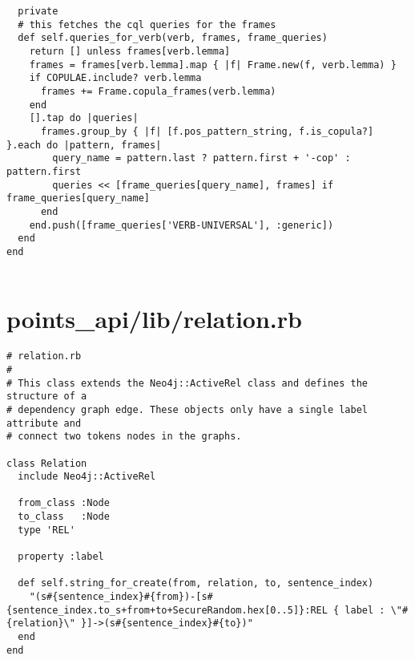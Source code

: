 \documentclass{article}
\begin{document}
\begin{verbatim}
  private
  # this fetches the cql queries for the frames
  def self.queries_for_verb(verb, frames, frame_queries)
    return [] unless frames[verb.lemma]
    frames = frames[verb.lemma].map { |f| Frame.new(f, verb.lemma) }
    if COPULAE.include? verb.lemma
      frames += Frame.copula_frames(verb.lemma)
    end
    [].tap do |queries|
      frames.group_by { |f| [f.pos_pattern_string, f.is_copula?] }.each do |pattern, frames|
        query_name = pattern.last ? pattern.first + '-cop' : pattern.first
        queries << [frame_queries[query_name], frames] if frame_queries[query_name]
      end
    end.push([frame_queries['VERB-UNIVERSAL'], :generic])
  end
end


\end{verbatim}
\pagebreak

\section*{points\_api/lib/relation.rb}
\begin{verbatim}
# relation.rb
#
# This class extends the Neo4j::ActiveRel class and defines the structure of a
# dependency graph edge. These objects only have a single label attribute and
# connect two tokens nodes in the graphs.

class Relation
  include Neo4j::ActiveRel

  from_class :Node
  to_class   :Node
  type 'REL'

  property :label

  def self.string_for_create(from, relation, to, sentence_index)
    "(s#{sentence_index}#{from})-[s#{sentence_index.to_s+from+to+SecureRandom.hex[0..5]}:REL { label : \"#{relation}\" }]->(s#{sentence_index}#{to})"
  end
end


\end{verbatim}
\pagebreak
\end{document}
